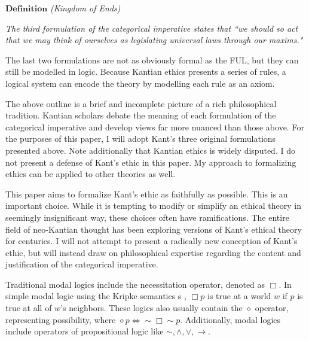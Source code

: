 \begin{isabellebody}
\begin{isamarkuptext}
\medskip 

$\textbf{Definition}$ \emph{(Kingdom of Ends)}

\emph{The third formulation of the categorical imperative states that ``we should so act that we may 
think of ourselves as legislating universal laws through our maxims."}\cite{KorsgaardFUL}

The last two formulations are not as obviously formal as the FUL, but they can still be
modelled in logic. Because Kantian ethics presents a series of rules, a logical system can encode 
the theory by modelling each rule as an axiom.

The above outline is a brief and incomplete picture of a rich philosophical tradition. Kantian scholars
debate the meaning of each formulation of the categorical imperative and develop views far more 
nuanced than those above. For the purposes of this paper, I will adopt Kant's three original 
formulations presented above. Note additionally that Kantian ethics is widely disputed. I do not present 
a defense of Kant's ethic in this paper. My approach to formalizing ethics can be applied to other 
theories as well.  

This paper aims to formalize Kant's ethic as faithfully as possible. This is an important choice. 
While it is tempting to modify or simplify an ethical theory in seemingly insignificant way, these 
choices often have ramifications. The entire field of neo-Kantian thought 
has been exploring versions of Kant's ethical theory for centuries. I will not attempt to present a 
radically new conception of Kant's ethic, but will instead draw on philosophical expertise regarding
the content and justification of the categorical imperative.%
\end{isamarkuptext}\isamarkuptrue%
%
\isadelimdocument
%
\endisadelimdocument
%
\isatagdocument
%
\isamarkuptrue%
%
\isamarkuptrue%
%
\endisatagdocument
{\isafolddocument}%
%
\isadelimdocument
%
\endisadelimdocument
%
\begin{isamarkuptext}%
Traditional modal logics include the necessitation operator, denoted as $\Box$. In simple modal logic
using the Kripke semantics s \cite{cresswell}, $\Box p$ is true at a world $w$ if $p$ is true at all of $w$'s neighbors. 
These logics also usually contain the $\diamond$ operator, representing possibility, where
 $\diamond p \iff \sim \Box \sim p$. Additionally, modal logics include operators of propositional 
logic like $\sim, \wedge, \vee, \rightarrow$.


\end{isamarkuptext}
\end{isabellebody}
